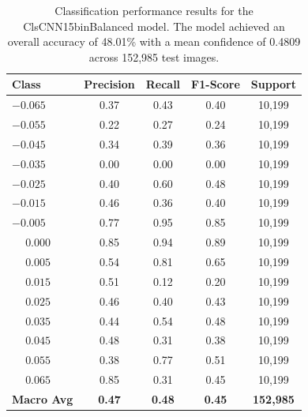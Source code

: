 \begin{table}[htbp]
\centering
\begin{tabular}{@{}lcccc@{}}
\toprule
\textbf{Class} & \textbf{Precision} & \textbf{Recall} & \textbf{F1-Score} & \textbf{Support} \\
\midrule
$-0.065$ & 0.37 & 0.43 & 0.40 & 10,199 \\
$-0.055$ & 0.22 & 0.27 & 0.24 & 10,199 \\
$-0.045$ & 0.34 & 0.39 & 0.36 & 10,199 \\
$-0.035$ & 0.00 & 0.00 & 0.00 & 10,199 \\
$-0.025$ & 0.40 & 0.60 & 0.48 & 10,199 \\
$-0.015$ & 0.46 & 0.36 & 0.40 & 10,199 \\
$-0.005$ & 0.77 & 0.95 & 0.85 & 10,199 \\
$\phantom{-}0.000$ & 0.85 & 0.94 & 0.89 & 10,199 \\
$\phantom{-}0.005$ & 0.54 & 0.81 & 0.65 & 10,199 \\
$\phantom{-}0.015$ & 0.51 & 0.12 & 0.20 & 10,199 \\
$\phantom{-}0.025$ & 0.46 & 0.40 & 0.43 & 10,199 \\
$\phantom{-}0.035$ & 0.44 & 0.54 & 0.48 & 10,199 \\
$\phantom{-}0.045$ & 0.48 & 0.31 & 0.38 & 10,199 \\
$\phantom{-}0.055$ & 0.38 & 0.77 & 0.51 & 10,199 \\
$\phantom{-}0.065$ & 0.85 & 0.31 & 0.45 & 10,199 \\
\midrule
\textbf{Macro Avg} & \textbf{0.47} & \textbf{0.48} & \textbf{0.45} & \textbf{152,985} \\
\bottomrule
\end{tabular}
\caption{Classification performance results for the ClsCNN15binBalanced model. The model achieved an overall accuracy of 48.01\% with a mean confidence of 0.4809 across 152,985 test images.}
\label{tab:clf_report_ClsCNN15binBalanced}
\end{table}



